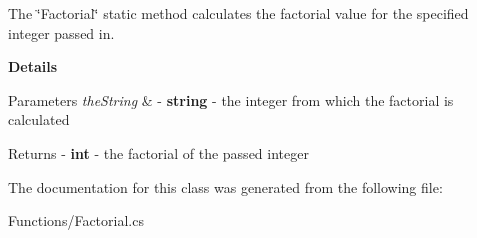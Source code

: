 The \char`\"{}\+Factorial\char`\"{} static method calculates the factorial value for the specified integer passed in. 

{\bfseries Details} 
\begin{DoxyParams}{Parameters}
{\em the\+String} & -\/ {\bfseries string} -\/ the integer from which the factorial is calculated \\
\hline
\end{DoxyParams}
\begin{DoxyReturn}{Returns}
-\/ {\bfseries int } -\/ the factorial of the passed integer 
\end{DoxyReturn}


The documentation for this class was generated from the following file\+:\begin{DoxyCompactItemize}
\item 
Functions/Factorial.\+cs\end{DoxyCompactItemize}
